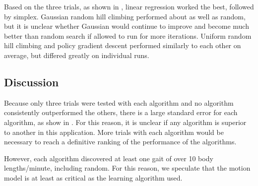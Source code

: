 Based on the three trials, as shown in , linear
regression worked the best, followed by simplex. Gaussian random hill
climbing performed about as well as random, but it is unclear whether
Gaussian would continue to improve and become much better than random
search if allowed to run for more iterations. Uniform random hill
climbing and policy gradient descent performed similarly to each other
on average, but differed greatly on individual runs.




\subsection{Discussion}


Because only three trials were tested with each algorithm and no
algorithm consistently outperformed the others, there is a large
standard error for each algorithm, as show in . For
this reason, it is unclear if any algorithm is superior to another in
this application. More trials with each algorithm would be necessary
to reach a definitive ranking of the performance of the algorithms.

However, each algorithm discovered at least one gait of over 10 body
lengths/minute, including random. For this reason, we speculate that
the motion model is at least as critical as the learning algorithm
used.
